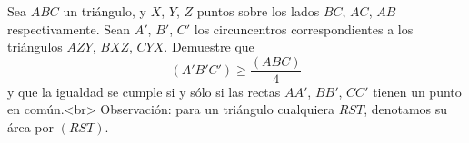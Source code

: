 Sea $ABC$ un triángulo, y $X$, $Y$, $Z$ puntos sobre los lados $BC$, $AC$, $AB$ respectivamente. Sean $A'$, $B'$, $C'$ los circuncentros correspondientes a los triángulos $AZY$, $BXZ$, $CYX$. Demuestre que 
\[(A'B'C') \geq \frac{(ABC)}{4}\]
y que la igualdad se cumple si y sólo si las rectas $AA'$, $BB'$, $CC'$ tienen un punto en común.<br>
Observación: para un triángulo cualquiera $RST$, denotamos su área por $(RST)$.
